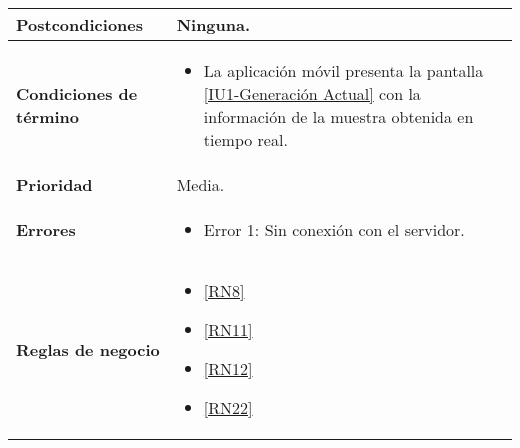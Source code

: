 \begin{longtable}{|J{5cm}|J{10.3cm}|}
	\textbf{Postcondiciones} &
		Ninguna.\\ \hline
	\textbf{Condiciones de término} & 
		\begin{itemize}
			\item La aplicación móvil presenta la pantalla \hyperref[fig:monitoreoReal]{[IU1-Generación Actual]} con la información de la muestra obtenida en tiempo real.
		\end{itemize} \\ \hline 
	\textbf{Prioridad} & 
		Media. \\ \hline
	\textbf{Errores} & 
		\begin{itemize}
		    \item \label{CUU1.1:Error1} Error 1: Sin conexión con el servidor.
		\end{itemize} \\ \hline
	\textbf{Reglas de negocio} & 
		\begin{itemize}
		    \item \ref{RN8}
			\item \ref{RN11}
			\item \ref{RN12}
			\item \ref{RN22}
		\end{itemize} \\ \hline
\end{longtable}

